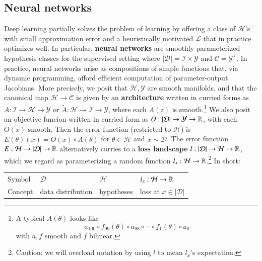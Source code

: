 \documentclass[openany, notitlepage, justified]{tufte-book}
\theoremstyle{plain}
\theoremstyle{definition}
\newcommand{\Cc}{\mathcal{C}}   \newcommand{\CC}{\mathbb{C}}
\newcommand{\Dd}{\mathcal{D}}
\newcommand{\Hh}{\mathcal{H}}
\newcommand{\Ii}{\mathcal{I}}
\newcommand{\Ll}{\mathcal{L}}
\newcommand{\Yy}{\mathcal{Y}}
\begin{document}
        \subsection{Neural networks}

        Deep learning partially solves the problem of learning by offering a 
        class of $\Hh$'s with small approximation error and a heuristically
        motivated $\Ll$ that in practice optimizes well.  In particular, 
        \textbf{neural networks} are smoothly parameterized hypothesis classes
        for the supervised setting where $|\Dd| = \Ii\times \Yy$ and $\Cc =
        \Yy^\Ii$.  In practice, neural networks arise as compositions of simple
        functions that, via dynamic programming, afford efficient computation of
        parameter-output Jacobians.  More precisely, we posit that $\Hh, \Yy$
        are smooth manifolds, and that the canonical map $\Hh\to\Cc$ is given
        by an \textbf{architecture} written in curried forms as $A:\Ii\to
        \Hh\to \Yy$ or $\tilde{A}:\Hh\to\Ii\to\Yy$, where each $A(z)$ is
        smooth.\footnote{
            A typical $\tilde{A}(\theta)$ looks like
            $$
                a_{100} \circ f_{99}(\theta) \circ a_{98} \circ
                               \cdots \circ f_1(\theta) \circ a_0 
            $$
            with $a, f$ smooth and $f$ bilinear.
        }
        We also posit an objective funcion written in curried form as
        $O:|\Dd|\to\Yy\to\RR$, with each $O(x)$ smooth.  Then the error
        function (restricted to $\Hh$) is $E(\theta)(x) = O(x)\circ
        \tilde{A}(\theta)$ for $\theta\in \Hh$ and $x\sim \Dd$.  The error
        function $E:\Hh\to |\Dd|\to\RR$ alternatively curries to a \textbf{loss
        landscape} $l:|\Dd|\to\Hh\to\RR$, which we regard as parameterizing a
        random function $l_x: \Hh\to\RR$.\footnote{
            Caution: we will overload notation by using $l$ to mean $l_x$'s 
            expectation.
        }
        In short:
        \begin{table}[h]
            \centering
            \begin{tabular}{l|lll}
                Symbol  &   $\Dd$           &   $\Hh$       &   $l_x:\Hh\to\RR$ \\
                Concept & data distribution & hypotheses    &   loss at $x\in|\Dd|$
            \end{tabular}
        \end{table}
\end{document}
